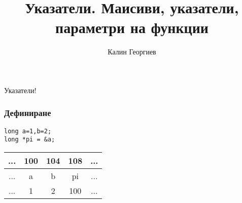 \documentclass{beamer}
\begin{document}
\title[Увод в програмирането]{Указатели. Маисиви, указатели, параметри на функции} 
\author{Калин Георгиев} 
\frame{\titlepage} 



\begin{frame}
\centerline{Указатели!}
\end{frame}



\begin{frame}[fragile]
\frametitle{Дефиниране}
\begin{flushleft}
\begin{lstlisting}
long a=1,b=2;
long *pi = &a;
\end{lstlisting}
\end{flushleft}

\begin{center}
  

\begin{tabular}{c | c | c | c | c}
... & 100 & 104 & 108 & ...\\\hline
... & a   & b   & pi  & ... \\\hline
... & 1   & 2   & 100 & ... \\
  
\end{tabular}
\end{center}
\end{frame}
\end{document}
